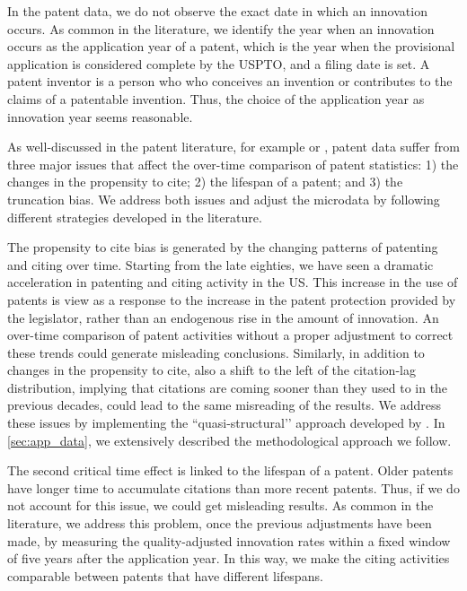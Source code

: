 \documentclass[dv_diss_main.tex]{subfiles}
\begin{document}
In the patent data, we do not observe the exact date in which an innovation occurs. As common in the literature, we identify the year when an innovation occurs as the application year of a patent, which is the year when the provisional application is considered complete by the USPTO, and a filing date is set. A patent inventor is a person who who conceives an invention or contributes to the claims of a patentable invention. Thus, the choice of the application year as innovation year seems reasonable.

As well-discussed in the patent literature, for example \cite{Hall2001} or \cite{Lerner2017}, patent data suffer from three major issues that affect the over-time comparison of patent statistics: 1) the changes in the propensity to cite; 2) the lifespan of a patent; and 3) the truncation bias. We address both issues and adjust the microdata by following different strategies developed in the literature. 

The propensity to cite bias is generated by the changing patterns of patenting and citing over time. Starting from the late eighties, we have seen a dramatic acceleration in patenting and citing activity in the US. This increase in the use of patents is view as a response to the increase in the patent protection provided by the legislator, rather than an endogenous rise in the amount of innovation. An over-time comparison of patent activities without a proper adjustment to correct these trends could generate misleading conclusions. Similarly, in addition to changes in the propensity to cite, also a shift to the left of the citation-lag distribution, implying that citations are coming sooner than they used to in the previous decades, could lead to the same misreading of the results. We address these issues by implementing the ``quasi-structural’’ approach developed by \cite{Hall2001}. In \ref{sec:app_data}, we extensively described the methodological approach we follow.

The second critical time effect is linked to the lifespan of a patent. Older patents have longer time to accumulate citations than more recent patents. Thus, if we do not account for this issue, we could get misleading results. As common in the literature, we address this problem, once the previous adjustments have been made, by measuring the quality-adjusted innovation rates within a fixed window of five years after the application year. In this way, we make the citing activities comparable between patents that have different lifespans.
\end{document}
